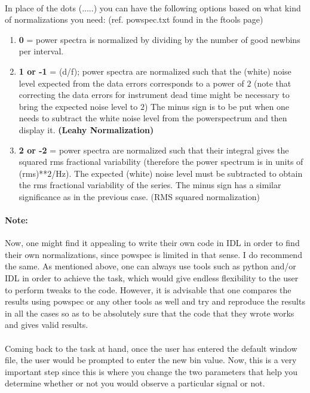\documentclass[a4paper,twoside]{report}
\numberwithin{equation}{section}
\begin{document}
\paragraph{}
In place of the dots (.....) you can have the following options based on what kind of normalizations you need: (ref. powspec.txt found in the ftools page)
\begin{enumerate}
\item \textbf{0} = power spectra is normalized by dividing by the number of good newbins per interval.
\item \textbf{1 or -1} = (d/f); power spectra are normalized such that the (white) noise level expected from the data errors corresponds to a power of $2$ (note that correcting the data errors for instrument dead time might be necessary to bring the expected noise level to $2$) The minus sign is to be put when one needs to subtract the white noise level from the powerspectrum and then display it. \textbf{(Leahy Normalization)}
\item \textbf{2 or -2} = power spectra are normalized such that their integral gives the squared rms fractional variability (therefore the power spectrum is in units of (rms)**$2$/Hz). The expected (white) noise level must be subtracted to obtain the rms fractional variability of the series. The minus sign has a similar significance as in the previous case. (RMS squared normalization)
\end{enumerate}
\paragraph{Note:}
Now, one might find it appealing to write their own code in IDL in order to find their own normalizations, since powspec is limited in that sense. I do recommend the same. As mentioned above, one can always use tools such as python and/or IDL in order to achieve the task, which would give endless flexibility to the user to perform tweaks to the code. However, it is advisable that one compares the results using powspec or any other tools as well and try and reproduce the results in all the cases so as to be absolutely sure that the code that they wrote works and gives valid results. 
\paragraph{}
Coming back to the task at hand, once the user has entered the default window file, the user would be prompted to enter the new bin value. Now, this is a very important step since this is where you change the two parameters that help you determine whether or not you would observe a particular signal or not. 
\end{document}

